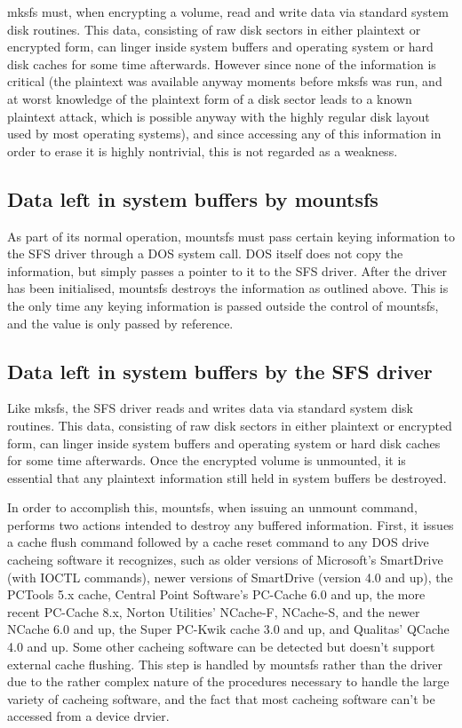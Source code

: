 mksfs must, when encrypting a volume, read and write data via standard system
disk routines.  This data, consisting of raw disk sectors in either plaintext
or encrypted form, can linger inside system buffers and operating system or
hard disk caches for some time afterwards.  However since none of the
information is critical (the plaintext was available anyway moments before
mksfs was run, and at worst knowledge of the plaintext form of a disk sector
leads to a known plaintext attack, which is possible anyway with the highly
regular disk layout used by most operating systems), and since accessing any of
this information in order to erase it is highly nontrivial, this is not 
regarded as a weakness.


\subsection{Data left in system buffers by mountsfs}

As part of its normal operation, mountsfs must pass certain keying information
to the SFS driver through a DOS system call.  DOS itself does not copy the
information, but simply passes a pointer to it to the SFS driver.  After the
driver has been initialised, mountsfs destroys the information as outlined
above.  This is the only time any keying information is passed outside the
control of mountsfs, and the value is only passed by reference.


\subsection{Data left in system buffers by the SFS driver}

Like mksfs, the SFS driver reads and writes data via standard system disk
routines.  This data, consisting of raw disk sectors in either plaintext or
encrypted form, can linger inside system buffers and operating system or hard
disk caches for some time afterwards.  Once the encrypted volume is unmounted,
it is essential that any plaintext information still held in system buffers be
destroyed.

In order to accomplish this, mountsfs, when issuing an unmount command, 
performs two actions intended to destroy any buffered information. First, it 
issues a cache flush command followed by a cache reset command to any DOS drive 
cacheing software it recognizes, such as older versions of Microsoft's 
SmartDrive (with IOCTL commands), newer versions of SmartDrive (version 4.0 and 
up), the PCTools 5.x cache, Central Point Software's PC-Cache 6.0 and up, the 
more recent PC-Cache 8.x, Norton Utilities' NCache-F, NCache-S, and the newer 
NCache 6.0 and up, the Super PC-Kwik cache 3.0 and up, and Qualitas' QCache 4.0 
and up.  Some other cacheing software can be detected but doesn't support 
external cache flushing.  This step is handled by mountsfs rather than the 
driver due to the rather complex nature of the procedures necessary to handle 
the large variety of cacheing software, and the fact that most cacheing 
software can't be accessed from a device drvier.


